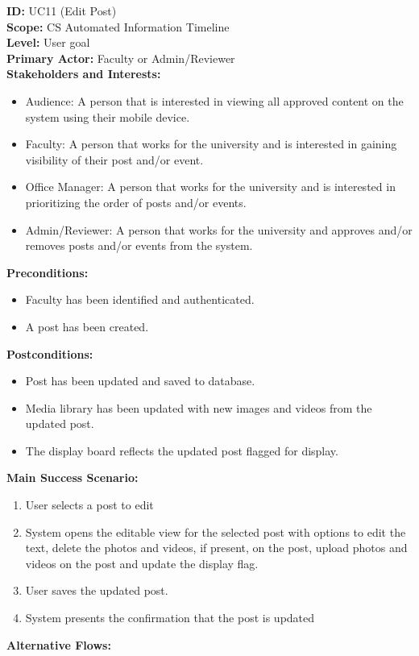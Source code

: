\textbf{ID:} UC11 (Edit Post) \\
\textbf{Scope:} CS Automated Information Timeline \\
\textbf{Level:} User goal \\
\textbf{Primary Actor:} Faculty or Admin/Reviewer \\
\textbf{Stakeholders and Interests:}
\begin{itemize}
    \item Audience: A person that is interested in viewing all approved content on the system using their mobile device.
    \item Faculty: A person that works for the university and is interested in gaining visibility of their post and/or event.
    \item Office Manager: A person that works for the university and is interested in prioritizing the order of posts and/or events.
    \item Admin/Reviewer: A person that works for the university and approves and/or removes posts and/or events from the system.
\end{itemize}
\textbf{Preconditions:}
\begin{itemize}
    \item Faculty has been identified and authenticated.
    \item A post has been created.
\end{itemize}
\textbf{Postconditions:}
\begin{itemize}
    \item Post has been updated and saved to database.
    \item Media library has been updated with new images and videos from the updated post.
    \item The display board reflects the updated post flagged for display.
\end{itemize}
\textbf{Main Success Scenario:}
\begin{enumerate}
    \item User selects a post to edit
    \item System opens the editable view for the selected post with options to edit the text, delete the photos and videos, if present, on the post, upload photos and videos on the post and update the display flag.
    \item User saves the updated post.
    \item System presents the confirmation that the post is updated
\end{enumerate}
\textbf{Alternative Flows:}  \\
